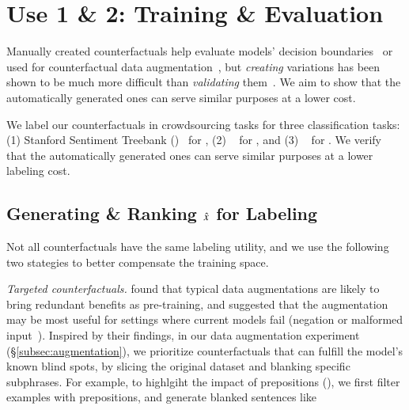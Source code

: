 \section{Use 1 \& 2: Training \& Evaluation}
\label{sec:app_label}

Manually created counterfactuals help evaluate models' decision boundaries~\cite{gardner2020contrast} or used for counterfactual data augmentation~\cite{kaushik2019learning}, but \emph{creating} variations has been shown to be much more difficult than \emph{validating} them~\cite{ribeiro2018sear}.
We aim to show that the automatically generated ones can serve similar purposes at a lower cost.

We label our counterfactuals in crowdsourcing tasks for three classification tasks: 
(1) Stanford Sentiment Treebank (\dsst)~\cite{socher2013recursive} for \sst,
(2) \dnli~\cite{bowman-etal-2015-large} for \nli, and 
(3) \dqqp~\cite{wang2018glue} for \qqp.
We verify that the automatically generated ones can serve similar purposes at a lower labeling cost.

\subsection{Generating \& Ranking $\hat{x}$ for Labeling}
\label{subsec:gen_counterfactual_for_labeling}

Not all counterfactuals have the same labeling utility, and we use the following two stategies to better compensate the training space.

\emph{Targeted counterfactuals.}
\citet{longpre2020effective} found that typical data augmentations are likely to bring redundant benefits as pre-training, and suggested that the augmentation may be most useful for settings where current models fail (\eg negation or malformed input~\cite{rogers2020primer,ettinger2020bert}).
Inspired by their findings, in our data augmentation experiment (\S\ref{subsec:augmentation}), we prioritize counterfactuals that can fulfill the model's known blind spots, by slicing the original dataset and blanking specific subphrases.  
For example, to highlgiht the impact of prepositions (\eg {}), we first filter examples with prepositions, and generate blanked sentences like 

